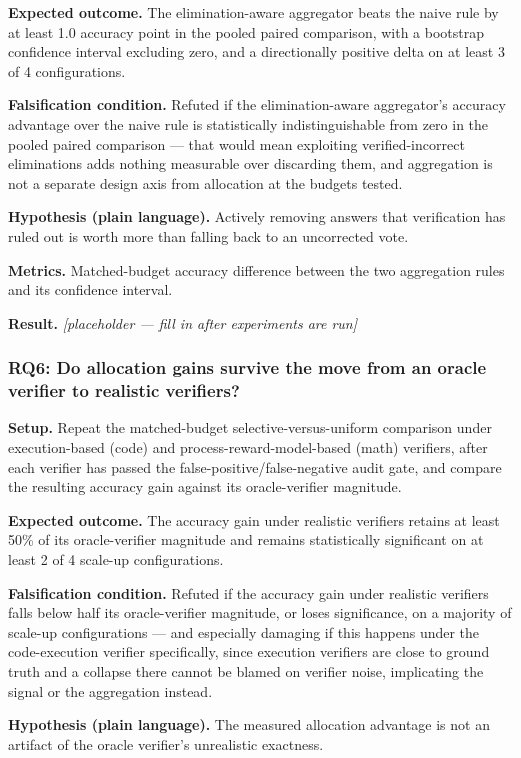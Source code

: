 \documentclass[11pt]{article}
\newcommand{\ph}{\textit{[placeholder --- fill in after experiments are run]}}
\begin{document}
\textbf{Expected outcome.} The elimination-aware aggregator beats the naive rule by at least 1.0 accuracy point in the pooled paired comparison, with a bootstrap confidence interval excluding zero, and a directionally positive delta on at least 3 of 4 configurations.

\textbf{Falsification condition.} Refuted if the elimination-aware aggregator's accuracy advantage over the naive rule is statistically indistinguishable from zero in the pooled paired comparison --- that would mean exploiting verified-incorrect eliminations adds nothing measurable over discarding them, and aggregation is not a separate design axis from allocation at the budgets tested.

\textbf{Hypothesis (plain language).} Actively removing answers that verification has ruled out is worth more than falling back to an uncorrected vote.

\textbf{Metrics.} Matched-budget accuracy difference between the two aggregation rules and its confidence interval.

\textbf{Result.} \ph

\subsubsection{RQ6: Do allocation gains survive the move from an oracle verifier to realistic verifiers?}
\textbf{Setup.} Repeat the matched-budget selective-versus-uniform comparison under execution-based (code) and process-reward-model-based (math) verifiers, after each verifier has passed the false-positive/false-negative audit gate, and compare the resulting accuracy gain against its oracle-verifier magnitude.

\textbf{Expected outcome.} The accuracy gain under realistic verifiers retains at least 50\% of its oracle-verifier magnitude and remains statistically significant on at least 2 of 4 scale-up configurations.

\textbf{Falsification condition.} Refuted if the accuracy gain under realistic verifiers falls below half its oracle-verifier magnitude, or loses significance, on a majority of scale-up configurations --- and especially damaging if this happens under the code-execution verifier specifically, since execution verifiers are close to ground truth and a collapse there cannot be blamed on verifier noise, implicating the signal or the aggregation instead.

\textbf{Hypothesis (plain language).} The measured allocation advantage is not an artifact of the oracle verifier's unrealistic exactness.
\end{document}
